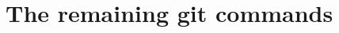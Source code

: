 \documentclass[usenames,svgnames,14pt]{beamer}
\begin{document}
\section{The remaining git commands}
%
%
\end{document}
